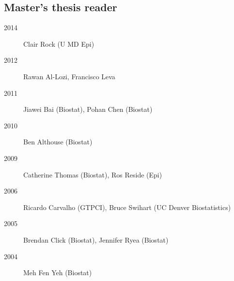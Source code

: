 \documentclass[12pt]{article}
\begin{document}
\subsection*{Master's thesis reader} 
\begin{description}
\item[\textnormal{2014}] Clair Rock (U MD Epi)
\item[\textnormal{2012}] Rawan Al-Lozi, Francisco Leva
\item[\textnormal{2011}] Jiawei Bai (Biostat), Pohan Chen (Biostat)
\item[\textnormal{2010}] Ben Althouse (Biostat) 
\item[\textnormal{2009}] Catherine Thomas (Biostat), Ros Reside (Epi) 
\item[\textnormal{2006}] Ricardo Carvalho (GTPCI), Bruce Swihart (UC Denver Biostatistics) 
\item[\textnormal{2005}] Brendan Click (Biostat), Jennifer Ryea (Biostat) 
\item[\textnormal{2004}] Meh Fen Yeh (Biostat) 
\end{description}

\end{document}
